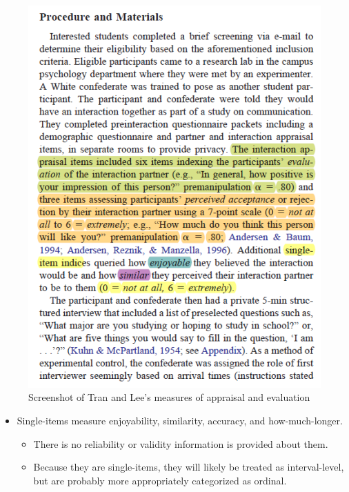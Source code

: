 \documentclass[
  english,
]{book}
\providecommand{\tightlist}{%
  \setlength{\itemsep}{0pt}\setlength{\parskip}{0pt}}
\begin{document}
\begin{figure}
\centering
\includegraphics{images/PsychoM/TranLee1.png}
\caption{Screenshot of Tran and Lee's measures of appraisal and evaluation}
\end{figure}

\begin{itemize}
\tightlist
\item
  Single-items measure enjoyability, similarity, accuracy, and how-much-longer.

  \begin{itemize}
  \tightlist
  \item
    There is no reliability or validity information is provided about them.
  \item
    Because they are single-items, they will likely be treated as interval-level, but are probably more appropriately categorized as ordinal.
  \end{itemize}
\end{itemize}
\end{document}

